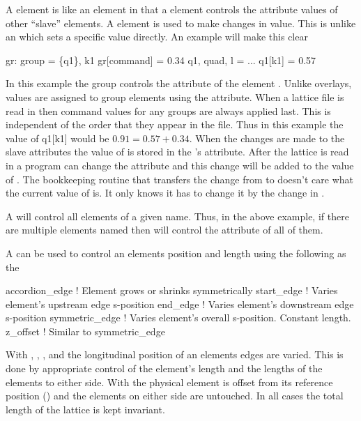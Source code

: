 A  element is like an  element in that a
 element controls the attribute values of other ``slave''
elements. A  element is used to make changes in value. This
is unlike an  which sets a specific value directly. An
example will make this clear
\begin{example}
  gr: group = \{q1\}, k1 
  gr[command] = 0.34 
  q1, quad, l = ...
  q1[k1] = 0.57
\end{example}
In this example the group  controls the  attribute of
the element . Unlike overlays, values are assigned to group
elements using the  attribute. When a lattice file is
read in then command values for any groups are always applied
last. This is independent of the order that they appear in the file.
Thus in this example the value of q1[k1] would be $0.91 = 0.57 + 0.34$.
When the changes are made to the slave attributes the value of
 is stored in the 's  attribute.
After the lattice is read in a program can change the 
attribute and this change will be added to the value of
. The bookkeeping routine that transfers the change from
 to  doesn't care what the current value of
 is. It only knows it has to change it by the change in
.

A  will control all elements of a given name. Thus, in
the above example, if there are multiple elements named 
then  will control the   attribute of all of them.

A  can be used to control an elements position and length
using the following as the 
\begin{example}
  accordion_edge  ! Element grows or shrinks symmetrically
  start_edge      ! Varies element's upstream edge s-position
  end_edge        ! Varies element's downstream edge s-position
  symmetric_edge  ! Varies element's overall s-position. Constant length.
  z_offset        ! Similar to symmetric_edge
\end{example}
With , , , and
 the longitudinal position of an elements edges are
varied. This is done by appropriate control of the element's length
and the lengths of the elements to either side. With  the
physical element is offset from its reference position
() and the elements on either side are untouched.
In all cases the total length of the lattice is kept invariant.


